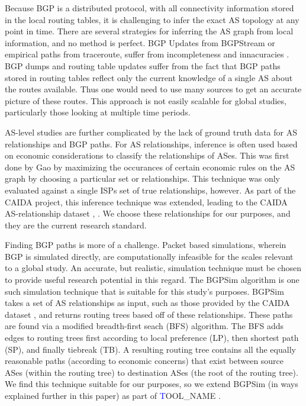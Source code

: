 \documentclass[10pt, conference, letterpaper]{IEEEtran}
\newcommand{\toolname}{{\textcolor{blue}TOOL\_NAME }}
\begin{document}
Because BGP is a distributed protocol, with all connectivity
information stored in the local routing tables, it is challenging to
infer the exact AS topology at any point in time.  There are several
strategies for inferring the AS graph from local information, and no method is perfect.  
BGP Updates from BGPStream \cite{BGPStream} or empirical paths from traceroute, suffer from
incompleteness and innacuracies \cite{tracerouteProblems}. BGP dumps and routing table updates
suffer from the fact that BGP paths stored in routing tables reflect only the current knowledge of
a single AS about the routes available. Thus one would need to use many sources to get an accurate picture of
these routes. This approach is not easily scalable for global studies, particularly those looking at multiple time periods.
\par
AS-level studies are further complicated by the lack of ground truth data for AS relationships and BGP paths. For AS relationships,
inference is often used based on economic considerations to classify the relationships of ASes. This was first done by Gao \cite{gao} by
maximizing the occurances of certain economic rules on the AS graph by choosing a particular set or relationships. This technique was only
evaluated against a single ISPs set of true relationships, however. As part of the CAIDA project, this inference technique was extended, leading
to the CAIDA AS-relationship dataset \cite{CAIDApaper}, \cite{CAIDA}. We choose these relationships for our purposes, and they are the current
research standard.
\par
Finding BGP paths is more of a challenge. Packet based simulations, wherein BGP is simulated directly, are computationally infeasible for the
scales relevant to a global study. An accurate, but realistic, simulation technique must be chosen to provide useful research potential in this regard.
The BGPSim algorithm \cite{quicksand} is one such simulation technique that is suitable for this study's purposes. BGPSim takes a set of AS relationships
as input, such as those provided by the CAIDA dataset \cite{CAIDA}, and returns routing trees based off of these relationships. These paths are found via
a modified breadth-first seach (BFS) algorithm. The BFS adds edges to routing trees first according to local preference (LP), then shortest path (SP), and finally tiebreak (TB).
A resulting routing tree contains all the equally reasonable paths (according to economic concerns) that exist between source ASes (within the routing tree) to 
destination ASes (the root of the routing tree). We find this technique suitable for our purposes, so we extend BGPSim 
(in ways explained further in this paper) as part of \toolname.
\end{document}

